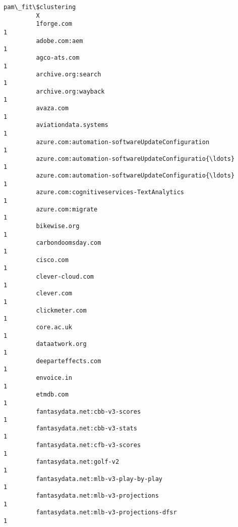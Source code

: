 \documentclass[11pt]{article}
\begin{document}
\begin{Verbatim}[commandchars=\\\{\}]
                                                             pam\_fit\$clustering  
         X                                                                       
         1forge.com                                                           1  
         adobe.com:aem                                                        1  
         agco-ats.com                                                         1  
         archive.org:search                                                   1  
         archive.org:wayback                                                  1  
         avaza.com                                                            1  
         aviationdata.systems                                                 1  
         azure.com:automation-softwareUpdateConfiguration                     1  
         azure.com:automation-softwareUpdateConfiguratio{\ldots}                   1  
         azure.com:automation-softwareUpdateConfiguratio{\ldots}                   1  
         azure.com:cognitiveservices-TextAnalytics                            1  
         azure.com:migrate                                                    1  
         bikewise.org                                                         1  
         carbondoomsday.com                                                   1  
         cisco.com                                                            1  
         clever-cloud.com                                                     1  
         clever.com                                                           1  
         clickmeter.com                                                       1  
         core.ac.uk                                                           1  
         dataatwork.org                                                       1  
         deeparteffects.com                                                   1  
         envoice.in                                                           1  
         etmdb.com                                                            1  
         fantasydata.net:cbb-v3-scores                                        1  
         fantasydata.net:cbb-v3-stats                                         1  
         fantasydata.net:cfb-v3-scores                                        1  
         fantasydata.net:golf-v2                                              1  
         fantasydata.net:mlb-v3-play-by-play                                  1  
         fantasydata.net:mlb-v3-projections                                   1  
         fantasydata.net:mlb-v3-projections-dfsr                              1  

\end{Verbatim}
\end{document}
